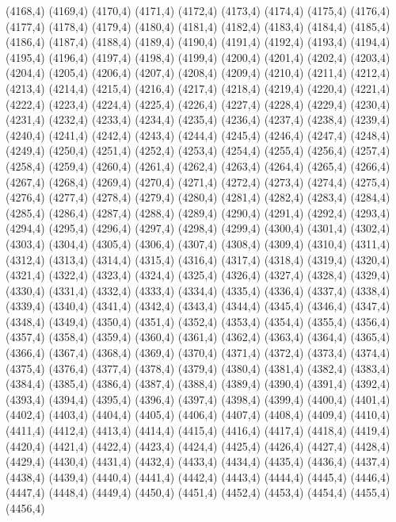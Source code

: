 (4168,4)
(4169,4)
(4170,4)
(4171,4)
(4172,4)
(4173,4)
(4174,4)
(4175,4)
(4176,4)
(4177,4)
(4178,4)
(4179,4)
(4180,4)
(4181,4)
(4182,4)
(4183,4)
(4184,4)
(4185,4)
(4186,4)
(4187,4)
(4188,4)
(4189,4)
(4190,4)
(4191,4)
(4192,4)
(4193,4)
(4194,4)
(4195,4)
(4196,4)
(4197,4)
(4198,4)
(4199,4)
(4200,4)
(4201,4)
(4202,4)
(4203,4)
(4204,4)
(4205,4)
(4206,4)
(4207,4)
(4208,4)
(4209,4)
(4210,4)
(4211,4)
(4212,4)
(4213,4)
(4214,4)
(4215,4)
(4216,4)
(4217,4)
(4218,4)
(4219,4)
(4220,4)
(4221,4)
(4222,4)
(4223,4)
(4224,4)
(4225,4)
(4226,4)
(4227,4)
(4228,4)
(4229,4)
(4230,4)
(4231,4)
(4232,4)
(4233,4)
(4234,4)
(4235,4)
(4236,4)
(4237,4)
(4238,4)
(4239,4)
(4240,4)
(4241,4)
(4242,4)
(4243,4)
(4244,4)
(4245,4)
(4246,4)
(4247,4)
(4248,4)
(4249,4)
(4250,4)
(4251,4)
(4252,4)
(4253,4)
(4254,4)
(4255,4)
(4256,4)
(4257,4)
(4258,4)
(4259,4)
(4260,4)
(4261,4)
(4262,4)
(4263,4)
(4264,4)
(4265,4)
(4266,4)
(4267,4)
(4268,4)
(4269,4)
(4270,4)
(4271,4)
(4272,4)
(4273,4)
(4274,4)
(4275,4)
(4276,4)
(4277,4)
(4278,4)
(4279,4)
(4280,4)
(4281,4)
(4282,4)
(4283,4)
(4284,4)
(4285,4)
(4286,4)
(4287,4)
(4288,4)
(4289,4)
(4290,4)
(4291,4)
(4292,4)
(4293,4)
(4294,4)
(4295,4)
(4296,4)
(4297,4)
(4298,4)
(4299,4)
(4300,4)
(4301,4)
(4302,4)
(4303,4)
(4304,4)
(4305,4)
(4306,4)
(4307,4)
(4308,4)
(4309,4)
(4310,4)
(4311,4)
(4312,4)
(4313,4)
(4314,4)
(4315,4)
(4316,4)
(4317,4)
(4318,4)
(4319,4)
(4320,4)
(4321,4)
(4322,4)
(4323,4)
(4324,4)
(4325,4)
(4326,4)
(4327,4)
(4328,4)
(4329,4)
(4330,4)
(4331,4)
(4332,4)
(4333,4)
(4334,4)
(4335,4)
(4336,4)
(4337,4)
(4338,4)
(4339,4)
(4340,4)
(4341,4)
(4342,4)
(4343,4)
(4344,4)
(4345,4)
(4346,4)
(4347,4)
(4348,4)
(4349,4)
(4350,4)
(4351,4)
(4352,4)
(4353,4)
(4354,4)
(4355,4)
(4356,4)
(4357,4)
(4358,4)
(4359,4)
(4360,4)
(4361,4)
(4362,4)
(4363,4)
(4364,4)
(4365,4)
(4366,4)
(4367,4)
(4368,4)
(4369,4)
(4370,4)
(4371,4)
(4372,4)
(4373,4)
(4374,4)
(4375,4)
(4376,4)
(4377,4)
(4378,4)
(4379,4)
(4380,4)
(4381,4)
(4382,4)
(4383,4)
(4384,4)
(4385,4)
(4386,4)
(4387,4)
(4388,4)
(4389,4)
(4390,4)
(4391,4)
(4392,4)
(4393,4)
(4394,4)
(4395,4)
(4396,4)
(4397,4)
(4398,4)
(4399,4)
(4400,4)
(4401,4)
(4402,4)
(4403,4)
(4404,4)
(4405,4)
(4406,4)
(4407,4)
(4408,4)
(4409,4)
(4410,4)
(4411,4)
(4412,4)
(4413,4)
(4414,4)
(4415,4)
(4416,4)
(4417,4)
(4418,4)
(4419,4)
(4420,4)
(4421,4)
(4422,4)
(4423,4)
(4424,4)
(4425,4)
(4426,4)
(4427,4)
(4428,4)
(4429,4)
(4430,4)
(4431,4)
(4432,4)
(4433,4)
(4434,4)
(4435,4)
(4436,4)
(4437,4)
(4438,4)
(4439,4)
(4440,4)
(4441,4)
(4442,4)
(4443,4)
(4444,4)
(4445,4)
(4446,4)
(4447,4)
(4448,4)
(4449,4)
(4450,4)
(4451,4)
(4452,4)
(4453,4)
(4454,4)
(4455,4)
(4456,4)
